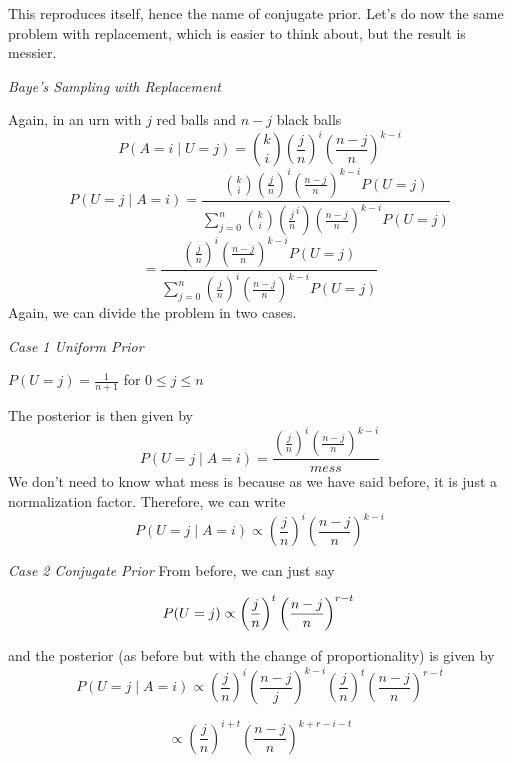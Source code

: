 This reproduces itself, hence the name of conjugate prior.  Let's do now the same problem with replacement, which is easier to think about, but the result is messier.

{\em Baye's Sampling with Replacement}

Again, in an urn with $j$ red balls and $n-j$ black balls
\begin{displaymath}
P(A=i \mid U=j) = {k\choose i} \left(\frac{j}{n}\right)^i \left( \frac{n-j}{n} \right)^{k-i}
\end{displaymath}
\begin{displaymath}
P(U=j \mid A=i) = \frac{{{k} \choose {i}} \left(\frac{j}{n} \right)^i
\left(\frac{n-j}{n} \right)^{k-i} P(U=j)}{\sum_{j=0}^{n} {{k}\choose {i}} \left( \frac{j}{n}^i\right)\left( \frac{n-j}{n} \right)^{k-i} P(U=j)}
\end{displaymath}
\begin{displaymath}
                = \frac{\left( \frac{j}{n} \right)^i \left( \frac{n-j}{n} \right)^{k-i}P(U=j)}{\sum_{j=0}^{n} \left( \frac{j}{n} \right)^i \left(\frac{n-j}{n} \right)^{k-i}P(U=j)}
\end{displaymath}
Again, we can divide the problem in two cases.

{\em Case 1 {\em Uniform Prior}}

$P(U=j) = \frac {1}{n+1}$ for $0 \leq j \leq n$

The posterior is then given by
\begin{displaymath}
P(U=j \mid A=i) = \frac {\left( \frac{j}{n}\right)^i \left(\frac{n-j}{n}\right)^{k-i}}{mess}
\end{displaymath}
We don't need to know what mess is because as we have said before, it is just
a normalization factor.  Therefore, we can write
\begin{displaymath}
P(U=j \mid A=i) \propto \left( \frac{j}{n}\right)^i \left(\frac{n-j}{n}\right)^{k-i}
\end{displaymath}

{\em Case 2 {\em Conjugate Prior}}
From before, we can just say

\begin{displaymath}
P(U=j) \propto \left(\frac{j}{n}\right)^t \left(\frac{n-j}{n}\right)^{r-t}\\
\end{displaymath}

and the posterior (as before but with the change of proportionality) is given by
\begin{displaymath}
P(U=j \mid A=i) \propto \left(\frac{j}{n}\right)^i \left(\frac{n-j}{j}\right)^{k-i} \left(\frac{j}{n}\right)^t \left(\frac{n-j}{n}\right)^{r-t}
\end{displaymath}

\begin{displaymath}
                 \propto \left(\frac{j}{n}\right)^{i+t} \left(\frac{n-j}{n} \right)^{k+r-i-t}
\end{displaymath}


